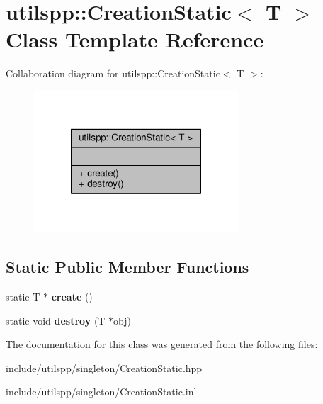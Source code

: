 \hypertarget{classutilspp_1_1CreationStatic}{\section{utilspp\-:\-:Creation\-Static$<$ T $>$ Class Template Reference}
\label{classutilspp_1_1CreationStatic}
}


Collaboration diagram for utilspp\-:\-:Creation\-Static$<$ T $>$\-:
\nopagebreak
\begin{figure}[H]
\begin{center}
\leavevmode
\includegraphics[width=216pt]{classutilspp_1_1CreationStatic__coll__graph}
\end{center}
\end{figure}
\subsection*{Static Public Member Functions}
\begin{DoxyCompactItemize}
\item 
\hypertarget{classutilspp_1_1CreationStatic_adf936d61ce6ba3f6310dc02fc368ccc9}{static T $\ast$ {\bfseries create} ()}\label{classutilspp_1_1CreationStatic_adf936d61ce6ba3f6310dc02fc368ccc9}

\item 
\hypertarget{classutilspp_1_1CreationStatic_a3470e96e86e9f7eb24d591f170645b1c}{static void {\bfseries destroy} (T $\ast$obj)}\label{classutilspp_1_1CreationStatic_a3470e96e86e9f7eb24d591f170645b1c}

\end{DoxyCompactItemize}


The documentation for this class was generated from the following files\-:\begin{DoxyCompactItemize}
\item 
include/utilspp/singleton/Creation\-Static.\-hpp\item 
include/utilspp/singleton/Creation\-Static.\-inl\end{DoxyCompactItemize}
